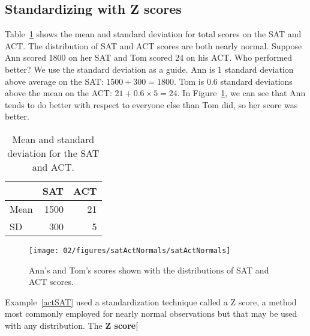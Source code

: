 \subsection{Standardizing with Z scores}

\begin{example}{Table~\ref{satACTstats} shows the mean and standard deviation for total scores on the SAT and ACT. The distribution of SAT and ACT scores are both nearly normal. Suppose Ann scored 1800 on her SAT and Tom scored 24 on his ACT. Who performed better?}\label{actSAT}
We use the standard deviation as a guide. Ann is 1 standard deviation above average on the SAT: $1500 + 300=1800$. Tom is 0.6 standard deviations above the mean on the ACT: $21+0.6\times 5=24$. In Figure~\ref{satActNormals}, we can see that Ann tends to do better with respect to everyone else than Tom did, so her score was better.
\end{example}

\begin{table}[ht]
\centering
\begin{tabular}{l r r}
  \hline
  & SAT & ACT \\
  \hline
Mean \hspace{0.3cm} & 1500 & 21 \\
SD & 300 & 5 \\
   \hline
\end{tabular}
\caption{Mean and standard deviation for the SAT and ACT.}
\label{satACTstats}
\end{table}

\begin{figure}[ht]
\centering
\texttt{[image: 02/figures/satActNormals/satActNormals]}
\caption{Ann's and Tom's scores shown with the distributions of SAT and ACT scores.}
\label{satActNormals}
\end{figure}

\textA{\pagebreak}

Example~\ref{actSAT} used a standardization technique called a Z score, a method most commonly employed for nearly normal observations but that may be used with any distribution. The \textbf{Z score}\marginpar[\raggedright\vspace{-3mm}

